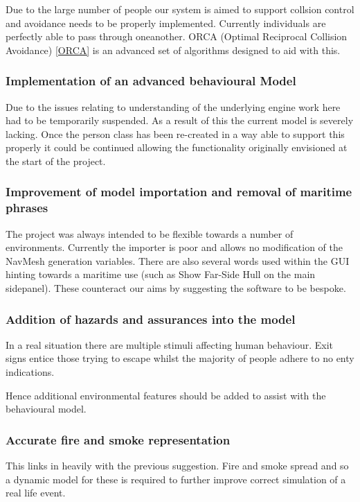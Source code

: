 Due to the large number of people our system is aimed to support collsion
control and avoidance needs to be properly implemented. Currently
individuals are perfectly able to pass through oneanother. ORCA (Optimal
Reciprocal Collision Avoidance) \ref{ORCA} is an advanced set of algorithms designed
to aid with this.


\subsubsection{Implementation of an advanced behavioural Model}

Due to the issues relating to understanding of the underlying engine
work here had to be temporarily suspended. As a result of this the
current model is severely lacking. Once the person class has been
re-created in a way able to support this properly it could be continued
allowing the functionality originally envisioned at the start of the
project.


\subsubsection{Improvement of model importation and removal of maritime phrases}

The project was always intended to be flexible towards a number of
environments. Currently the importer is poor and allows no modification
of the NavMesh generation variables. There are also several words
used within the GUI hinting towards a maritime use (such as Show Far-Side
Hull on the main sidepanel). These counteract our aims by suggesting
the software to be bespoke.


\subsubsection{Addition of hazards and assurances into the model}

In a real situation there are multiple stimuli affecting human behaviour.
Exit signs entice those trying to escape whilst the majority of people
adhere to no enty indications.

Hence additional environmental features should be added to assist
with the behavioural model.


\subsubsection{Accurate fire and smoke representation}

This links in heavily with the previous suggestion. Fire and smoke
spread and so a dynamic model for these is required to further improve
correct simulation of a real life event.

